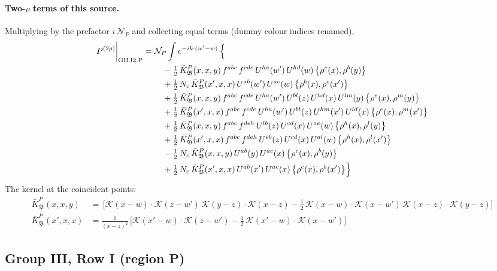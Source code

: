 \documentclass[10pt]{article}
\numberwithin{equation}{section}
\newcommand{\KK}{\mathcal K}
\newcommand{\NP}{\mathcal N_{P}}
\begin{document}
\paragraph{Two-$\rho$ terms of this source.} Multiplying by the prefactor $i\,\NP$ and collecting equal terms (dummy colour indices renamed),
\begin{align}
P^{(2\rho)}\bigg|_{\rm GII.I2.P}={}&\NP\int e^{-ik\cdot(w'-w)}\,\Big\{\notag\\
&\quad -\tfrac12\,\bar K^{P}_{\mathfrak B}(x,x,y)\,f^{abc}\,f^{cde}\,U^{ha}(w')\,U^{hd}(w)\,\big\{\rho^{e}(x),\rho^{b}(y)\big\}\notag\\
&\quad +\tfrac12\,N_{c}\,\bar K^{P}_{\mathfrak B}(x',x,x)\,U^{ab}(w')\,U^{ac}(w)\,\big\{\rho^{b}(x),\rho^{c}(x')\big\}\notag\\
&\quad +\tfrac12\,\bar K^{P}_{\mathfrak B}(x,x,y)\,f^{abc}\,f^{cde}\,U^{ha}(w')\,U^{bl}(z)\,U^{hd}(x)\,U^{lm}(y)\,\big\{\rho^{e}(x),\rho^{m}(y)\big\}\notag\\
&\quad +\tfrac12\,\bar K^{P}_{\mathfrak B}(x',x,x)\,f^{abc}\,f^{cde}\,U^{ha}(w')\,U^{bl}(z)\,U^{hm}(x')\,U^{ld}(x)\,\big\{\rho^{e}(x),\rho^{m}(x')\big\}\notag\\
&\quad +\tfrac12\,\bar K^{P}_{\mathfrak B}(x,x,y)\,f^{abc}\,f^{deh}\,U^{lb}(z)\,U^{cd}(x)\,U^{ae}(w)\,\big\{\rho^{h}(x),\rho^{l}(y)\big\}\notag\\
&\quad +\tfrac12\,\bar K^{P}_{\mathfrak B}(x',x,x)\,f^{abc}\,f^{deh}\,U^{eb}(z)\,U^{cd}(x)\,U^{al}(w)\,\big\{\rho^{h}(x),\rho^{l}(x')\big\}\notag\\
&\quad -\tfrac12\,N_{c}\,\bar K^{P}_{\mathfrak B}(x,x,y)\,U^{ab}(y)\,U^{ac}(x)\,\big\{\rho^{c}(x),\rho^{b}(y)\big\}\notag\\
&\quad +\tfrac12\,N_{c}\,\bar K^{P}_{\mathfrak B}(x',x,x)\,U^{ab}(x')\,U^{ac}(x)\,\big\{\rho^{c}(x),\rho^{b}(x')\big\}\Big\}\label{eq:res-GII.I2.P}
\end{align}
The kernel at the coincident points:
\begin{align*}
\bar K^{P}_{\mathfrak B}(x,x,y)&=\,\Big[\KK(x-w)\cdot\KK(z-w')\,\KK(y-z)\cdot\KK(x-z)-\frac{1}{2}\,\KK(x-w)\cdot\KK(x-w')\,\KK(x-z)\cdot\KK(y-z)\Big]\\\bar K^{P}_{\mathfrak B}(x',x,x)&=\frac{1}{(x-z)^2}\,\Big[\KK(x'-w)\cdot\KK(z-w')-\frac{1}{2}\,\KK(x'-w)\cdot\KK(x-w')\Big]
\end{align*}
\subsection{Group III, Row I (region P)}\label{sec:GIII.I.P}
\end{document}
